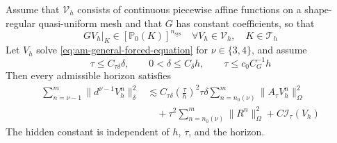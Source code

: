 \documentclass[11pt]{article}
\begin{document}
\begin{lem}
\label{lem:adams-piecewise-affine-increment-bound}
Assume that \(\mathcal V_h\) consists of continuous piecewise affine
functions on a shape-regular quasi-uniform mesh and that \(G\) has constant
coefficients, so that
\begin{equation}
GV_h\vert_K\in[\mathbb P_0(K)]^{n_{\mathrm{sys}}}
\quad\forall V_h\in\mathcal V_h,\quad K\in\mathcal T_h
\label{eq:adams-piecewise-affine-mapping}
\end{equation}
Let \(V_h\) solve \eqref{eq:am-general-forced-equation} for
\(\nu\in\{3,4\}\), and assume
\begin{equation}
\tau\le C_{\tau\delta}\delta,\qquad
0<\delta\le C_{\delta}h,\qquad
\tau\le c_0C_G^{-1}h
\label{eq:adams-piecewise-affine-parameters}
\end{equation}
Then every admissible horizon satisfies
\begin{align}
\sum_{n=\nu-1}^{m}\|d^{\nu-1}V_h^n\|_{\delta}^2
&\lesssim C_{\tau\delta}\left(\frac{\tau}{h}\right)^2
\tau\delta\sum_{n=n_0(\nu)}^{m}\|A_{\tau}V_h^n\|_{\Omega}^2
\label{eq:adams-piecewise-affine-increment-solution}\\
&\quad+\tau^2\sum_{n=n_0(\nu)}^{m}\|R^n\|_{\Omega}^2
+C\mathcal I_{\tau}(V_h)
\label{eq:adams-piecewise-affine-increment-forcing}
\end{align}
The hidden constant is independent of \(h\), \(\tau\), and the horizon.
\end{lem}
\end{document}
